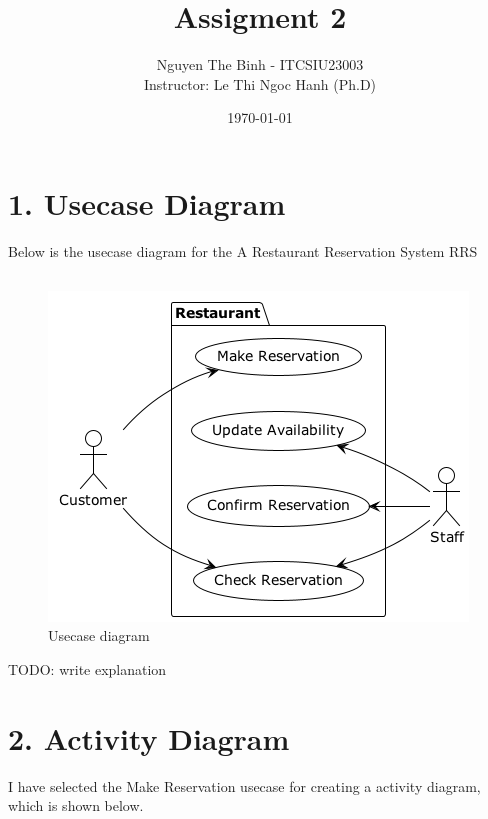 \documentclass{article}
\title{Assigment 2}
\author{Nguyen The Binh - ITCSIU23003\\Instructor: Le Thi Ngoc Hanh (Ph.D)}
\date{\today}
\begin{document}
\maketitle

\section*{1. Usecase Diagram}
Below is the usecase diagram for the A Restaurant Reservation System RRS
\subsection*{}
\begin{figure}[h]
  \includegraphics[scale=0.5]{out/usecase/usecase.png}
  \centering
  \caption{Usecase diagram}
  \centering
\end{figure}
TODO: write explanation

\clearpage %


\section*{2. Activity Diagram}
I have selected the Make Reservation usecase for creating a activity diagram, which is shown below.
\end{document}
